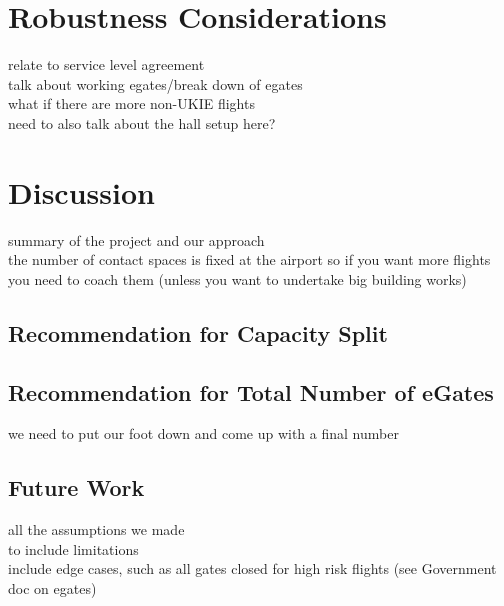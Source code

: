 \documentclass[10pt]{article}
\begin{document}
\section{Robustness Considerations}
relate to service level agreement \\
talk about working \glspl{egate}/break down of \glspl{egate}  \\
what if there are more non-UKIE flights  \\ 
need to also talk about the hall setup here?



\section{Discussion}
summary of the project and our approach \\
the number of contact spaces is fixed at the airport so if you want more flights you need to coach them (unless you want to undertake big building works)

\subsection{Recommendation for Capacity Split}

\subsection{Recommendation for Total Number of eGates}
we need to put our foot down and come up with a final number

\subsection{Future Work}
all the assumptions we made \\
to include limitations \\
include edge cases, such as all gates closed for high risk flights (see Government doc on \glspl{egate}) 

{\footnotesize
}
% 
\end{document}
